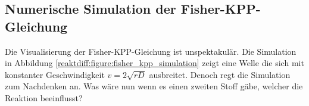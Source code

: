 \subsection{Numerische Simulation der Fisher-KPP-Gleichung
\label{reaktdiff:subsection:fkppsimulation}}
Die Visualisierung der Fisher-KPP-Gleichung ist unspektakulär.
Die Simulation in Abbildung \ref{reaktdiff:figure:fisher_kpp_simulation} zeigt eine Welle die sich mit konstanter Geschwindigkeit \(v = 2\!\sqrt{rD}\) ausbreitet.
Denoch regt die Simulation zum Nachdenken an.
Was wäre nun wenn es einen zweiten Stoff gäbe, welcher die Reaktion beeinflusst?
%
